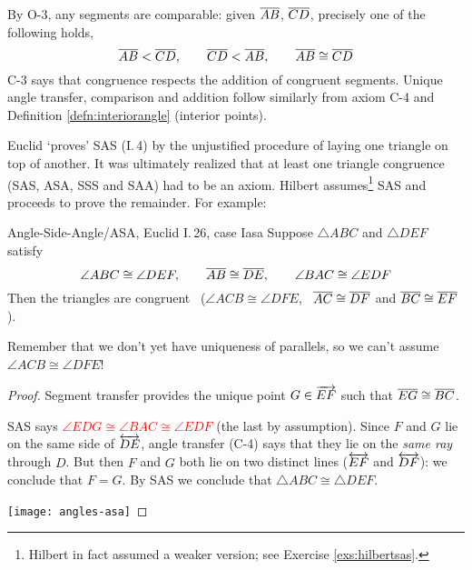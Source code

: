 By O-3, any segments are comparable: given $\overline{AB}$, $\overline{CD}$, precisely one of the following holds,
\[\overline{AB}<\overline{CD},\qquad \overline{CD}<\overline{AB},\qquad\overline{AB}\cong\overline{CD}\]
C-3 says that congruence respects the addition of congruent segments. Unique angle transfer, comparison and addition follow similarly from axiom C-4 and Definition \ref{defn:interiorangle} (interior points).



Euclid `proves' SAS (I.\,4) by the unjustified procedure of laying one triangle on top of another. It was ultimately realized that at least one triangle congruence (SAS, ASA, SSS and SAA) had to be an axiom. Hilbert assumes\footnote{Hilbert in fact assumed a weaker version; see Exercise \ref{exs:hilbertsas}.}
SAS and proceeds to prove the remainder. For example:

\begin{thm}{Angle-Side-Angle/ASA, Euclid I.\,26, case I}{asa}
Suppose $\triangle ABC$ and $\triangle DEF$ satisfy
\[\angle ABC\cong\angle DEF,\qquad \overline{AB}\cong\overline{DE},\qquad\angle BAC\cong\angle EDF\]
Then the triangles are congruent \ ($\angle ACB\cong\angle DFE$, \ $\overline{AC}\cong\overline{DF}$ and $\overline{BC}\cong\overline{EF}$).
\end{thm}

Remember that we don't yet have uniqueness of parallels, so we can't assume $\angle ACB\cong\angle DFE$!

\begin{proof}
Segment transfer provides the unique point $G\in \overrightarrow{EF}$ such that \textcolor{orange}{$\overline{EG}\cong \overline{BC}$}.\par
\begin{minipage}[t]{0.65\linewidth}\vspace{0pt}
SAS says \textcolor{red}{$\angle EDG\cong\angle BAC\cong \angle EDF$} (the last by assumption).\medbreak
Since $F$ and $G$ lie on the same side of $\overleftrightarrow{DE}$, angle transfer (C-4) says that they lie on the \emph{same ray} through $D$.\medbreak
But then $F$ and $G$ both lie on two distinct lines ($\overleftrightarrow{EF}$ and $\overleftrightarrow{DF}$): we conclude that $F=G$.\medbreak
By SAS we conclude that $\triangle ABC\cong\triangle DEF$.
\end{minipage}
\begin{minipage}[t]{0.34\linewidth}\vspace{-28pt}
\flushright\texttt{[image: angles-asa]}
\end{minipage}
\end{proof}


